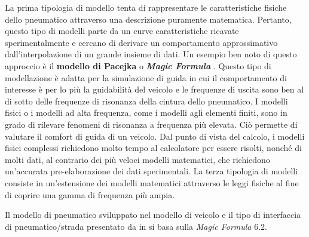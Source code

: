 La prima tipologia di modello tenta di rappresentare le caratteristiche fisiche dello pneumatico attraverso una descrizione puramente matematica. Pertanto, questo tipo di modelli parte da un curve caratteristiche ricavate sperimentalmente e cercano di derivare un comportamento approssimativo dall'interpolazione di un grande insieme di dati. Un esempio ben noto di questo approccio è il \textbf{modello di Pacejka} o \textbf{\textit{Magic Formula}} \cite{hans}. Questo tipo di modellazione è adatta per la simulazione di guida in cui il comportamento di interesse è per lo più la guidabilità del veicolo e le frequenze di uscita sono ben al di sotto delle frequenze di risonanza della cintura dello pneumatico. I modelli fisici o i modelli ad alta frequenza, come i modelli agli elementi finiti, sono in grado di rilevare fenomeni di risonanza a frequenza più elevata. Ciò permette di valutare il comfort di guida di un veicolo. Dal punto di vista del calcolo, i modelli fisici complessi richiedono molto tempo al calcolatore per essere risolti, nonché di molti dati, al contrario dei più veloci modelli matematici, che richiedono un'accurata pre-elaborazione dei dati sperimentali. La terza tipologia di modelli consiste in un'estensione dei modelli matematici attraverso le leggi fisiche al fine di coprire una gamma di frequenza più ampia.

Il modello di pneumatico sviluppato nel modello di veicolo e il tipo di interfaccia di pneumatico/strada presentato da \citeauthor{Larcher} in \cite{Larcher} si basa sulla \textit{Magic Formula} 6.2.
%
